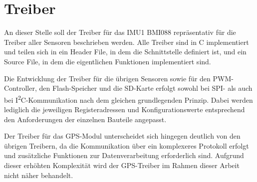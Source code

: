 \section{Treiber}
\label{sec:treiber}
An dieser Stelle soll der Treiber für das IMU1 BMI088 repräsentativ für die Treiber aller Sensoren beschrieben werden. Alle Treiber sind in C implementiert und teilen sich in ein Header File, in dem die Schnittstelle definiert ist, und ein Source File, in dem die eigentlichen Funktionen implementiert sind. 

Die Entwicklung der Treiber für die übrigen Sensoren sowie für den PWM-Controller, den Flash-Speicher und die SD-Karte erfolgt sowohl bei SPI- als auch bei I\textsuperscript{2}C-Kommunikation nach dem gleichen grundlegenden Prinzip. Dabei werden lediglich die jeweiligen Registeradressen und Konfigurationswerte entsprechend den Anforderungen der einzelnen Bauteile angepasst.

Der Treiber für das GPS-Modul unterscheidet sich hingegen deutlich von den übrigen Treibern, da die Kommunikation über ein komplexeres Protokoll erfolgt und zusätzliche Funktionen zur Datenverarbeitung erforderlich sind. Aufgrund dieser erhöhten Komplexität wird der GPS-Treiber im Rahmen dieser Arbeit nicht näher behandelt.
